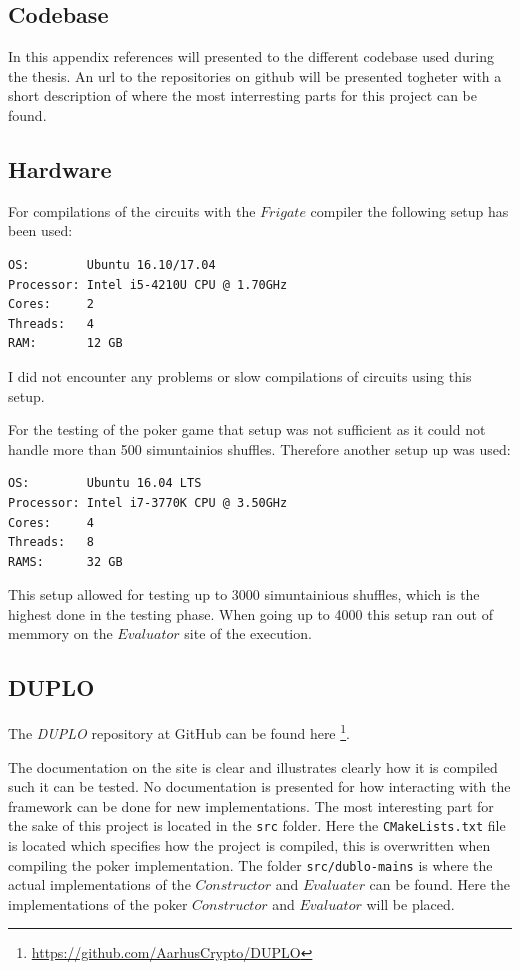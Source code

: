 \documentclass[twoside,11pt,openright]{report}
\newcommand{\DUPLO}{\textit{DUPLO} }
\begin{document}
\begin{appendices}
\chapter{Codebase}
In this appendix references will presented to the different codebase used during the thesis. An url to the repositories on github will be presented togheter with a short description of where the most interresting parts for this project can be found.

\section{Hardware}
\label{app:hardware}
For compilations of the circuits with the $Frigate$ compiler the following setup has been used:

\begin{center}
\begin{verbatim}
OS:        Ubuntu 16.10/17.04
Processor: Intel i5-4210U CPU @ 1.70GHz
Cores:     2
Threads:   4
RAM:       12 GB
\end{verbatim}
\end{center}

I did not encounter any problems or slow compilations of circuits using this setup.

\bigskip
For the testing of the poker game that setup was not sufficient as it could not handle more than 500 simuntainios shuffles. Therefore another setup up was used:

\begin{center}
\begin{verbatim}
OS:        Ubuntu 16.04 LTS
Processor: Intel i7-3770K CPU @ 3.50GHz
Cores:     4
Threads:   8
RAMS:      32 GB
\end{verbatim}
\end{center}

This setup allowed for testing up to 3000 simuntainious shuffles, which is the highest done in the testing phase. When going up to 4000 this setup ran out of memmory on the $Evaluator$ site of the execution.


\section{DUPLO}
\label{app:duplo}
The \DUPLO repository at GitHub can be found here \footnote{\url{https://github.com/AarhusCrypto/DUPLO}}.

The documentation on the site is clear and illustrates clearly how it is compiled such it can be tested. No documentation is presented for how interacting with the framework can be done for new implementations. The most interesting part for the sake of this project is located in the \verb|src| folder. Here the \verb|CMakeLists.txt| file is located which specifies how the project is compiled, this is overwritten when compiling the poker implementation. The folder \verb|src/dublo-mains| is where the actual implementations of the $Constructor$ and $Evaluater$ can be found. Here the implementations of the poker $Constructor$ and $Evaluator$ will be placed.


\end{appendices}
\end{document}
